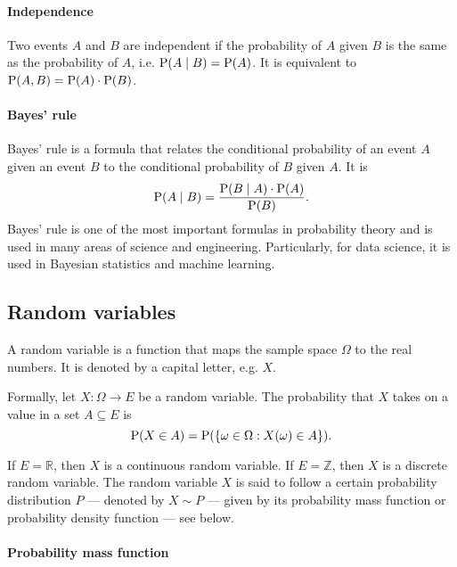 \paragraph{Independence}

Two events $A$ and $B$ are independent if the probability of $A$ given $B$ is the
same as the probability of $A$, i.e. $\operatorname{P}(A \mid B) = \operatorname{P}(A)$.  It is equivalent to
$\operatorname{P}(A, B) = \operatorname{P}(A) \cdot \operatorname{P}(B)$.

\paragraph{Bayes' rule}

Bayes' rule is a formula that relates the conditional probability of an event $A$
given an event $B$ to the conditional probability of $B$ given $A$.  It is
\begin{equation}
  \label{eq:bayes}
  \operatorname{P}(A \mid B) = \frac{\operatorname{P}(B \mid A) \cdot \operatorname{P}(A)}{\operatorname{P}(B)}\text{.}
\end{equation}
Bayes' rule is one of the most important formulas in probability theory and is used
in many areas of science and engineering.  Particularly, for data science, it is
used in Bayesian statistics and machine learning.

\subsection{Random variables}

A random variable is a function that maps the sample space $\Omega$ to the real
numbers.  It is denoted by a capital letter, e.g. $X$.

Formally, let $X : \Omega \rightarrow E$ be a random variable.  The
probability that $X$ takes on a value in a set $A \subseteq E$ is
\begin{equation}
  \label{eq:rv}
  \operatorname{P}(X \in A) = \operatorname{P}(\{\omega \in \Omega : X(\omega) \in A\})\text{.}
\end{equation}

If $E = \mathbb{R}$, then $X$ is a continuous random variable.  If $E = \mathbb{Z}$,
then $X$ is a discrete random variable.  The random variable $X$ is said to follow
a certain probability distribution $P$ --- denoted by $X \sim P$ --- given by its
probability mass function or probability density function --- see below.

\paragraph{Probability mass function}


